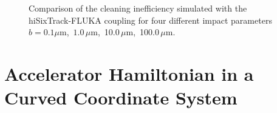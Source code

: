 \begin{appendices}
\begin{figure}[t]
  \centering
  \caption{Comparison of the cleaning inefficiency simulated with the hiSixTrack-FLUKA coupling for four different impact parameters \mbox{$b=0.1\mu$m, $1.0\,\mu$m, 10.0$\,\mu$m, 100.0$\,\mu$m}. }  
  \label{pic:16062201}
  \end{figure}






\clearpage

\section{Accelerator Hamiltonian in a Curved Coordinate System} \label{hcurv}


\begin{figure}[b]  
  \centering
\begin{tikzpicture}[scale=1.3]
  \footnotesize





\end{tikzpicture}
\end{figure}
\end{appendices}
